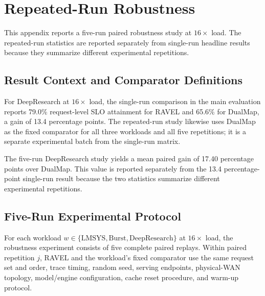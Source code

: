 \section{Repeated-Run Robustness}
\label{app:repeated-runs}

This appendix reports a five-run paired robustness study at
$16\times$ load.  The repeated-run statistics are reported separately from
single-run headline results because they summarize different experimental
repetitions.


\subsection{Result Context and Comparator Definitions}
\label{sec:appendix:result-contexts}

For DeepResearch at $16\times$ load, the single-run comparison in the main
evaluation reports 79.0\% request-level SLO attainment for \textsc{RAVEL} and
65.6\% for DualMap, a gain of 13.4 percentage points.
The repeated-run study likewise uses DualMap as the fixed comparator for all
three workloads and all five repetitions; it is a separate experimental batch
from the single-run matrix.

The five-run DeepResearch study yields a mean paired gain of 17.40 percentage
points over DualMap.  This value is reported separately from the 13.4
percentage-point single-run result because the two statistics summarize
different experimental repetitions.


\subsection{Five-Run Experimental Protocol}
\label{sec:appendix:repeated-run-protocol}

For each workload
$w\in\{\mathrm{LMSYS},\mathrm{Burst},\mathrm{DeepResearch}\}$ at
$16\times$ load, the robustness experiment consists of five complete paired
replays.  Within paired repetition $j$, RAVEL and the workload's fixed
comparator use the same request set and order, trace timing, random seed,
serving endpoints, physical-WAN topology, model/engine configuration, cache
reset procedure, and warm-up protocol.

